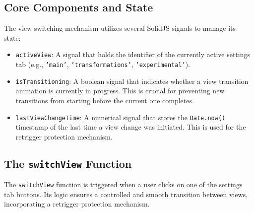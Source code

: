 \documentclass[10pt]{article}
\begin{document}
\subsection{Core Components and State}

The view switching mechanism utilizes several SolidJS signals to manage its state:
\begin{itemize}
    \item \texttt{activeView}: A signal that holds the identifier of the currently active settings tab (e.g., \texttt{'main'}, \texttt{'transformations'}, \texttt{'experimental'}).
    \item \texttt{isTransitioning}: A boolean signal that indicates whether a view transition animation is currently in progress. This is crucial for preventing new transitions from starting before the current one completes.
    \item \texttt{lastViewChangeTime}: A numerical signal that stores the \texttt{Date.now()} timestamp of the last time a view change was initiated. This is used for the retrigger protection mechanism.
\end{itemize}

\subsection{The \texttt{switchView} Function}

The \texttt{switchView} function is triggered when a user clicks on one of the settings tab buttons. Its logic ensures a controlled and smooth transition between views, incorporating a retrigger protection mechanism.
\end{document}

